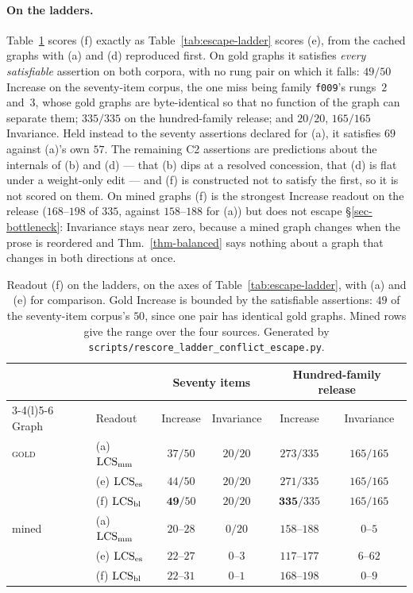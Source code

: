 \paragraph{On the ladders.} Table~\ref{tab:balanced-ladder} scores (f) exactly as
Table~\ref{tab:escape-ladder} scores (e), from the cached graphs with (a) and (d) reproduced first.
On gold graphs it satisfies \emph{every satisfiable} assertion on both corpora, with no rung pair on
which it falls: $49/50$ Increase on the seventy-item corpus, the one miss being family \texttt{f009}'s
rungs~$2$ and~$3$, whose gold graphs are byte-identical so that no function of the graph can separate
them; $335/335$ on the hundred-family release; and $20/20$, $165/165$ Invariance. Held instead to the
seventy assertions declared for (a), it satisfies $69$ against (a)'s own $57$. The remaining C2
assertions are predictions about the internals of (b) and (d) --- that (b) dips at a resolved
concession, that (d) is flat under a weight-only edit --- and (f) is constructed not to satisfy the
first, so it is not scored on them. On mined graphs (f) is the strongest Increase readout on the
release ($168$--$198$ of $335$, against $158$--$188$ for (a)) but does not escape
\S\ref{sec-bottleneck}: Invariance stays near zero, because a mined graph changes when the prose is
reordered and Thm.~\ref{thm-balanced} says nothing about a graph that changes in both directions at
once.

\begin{table}[tbp]
\centering\small
\caption{Readout (f) on the ladders, on the axes of Table~\ref{tab:escape-ladder}, with (a) and
  (e) for comparison. Gold Increase is bounded by the satisfiable assertions: $49$ of the
  seventy-item corpus's $50$, since one pair has identical gold graphs. Mined rows give the range over
  the four sources. Generated by \texttt{scripts/rescore\_ladder\_conflict\_escape.py}.}
\label{tab:balanced-ladder}
\setlength{\tabcolsep}{4pt}
\begin{tabular}{@{}llcccc@{}}
\toprule
& & \multicolumn{2}{c}{Seventy items} & \multicolumn{2}{c}{Hundred-family release} \\
\cmidrule(lr){3-4}\cmidrule(l){5-6}
Graph & Readout & Increase & Invariance & Increase & Invariance \\
\midrule
\textsc{gold} & (a) $\mathrm{LCS}_{\mathrm{mm}}$     & $37/50$ & $20/20$ & $273/335$ & $165/165$ \\
              & (e) $\mathrm{LCS}_{\mathrm{es}}$    & $44/50$ & $20/20$ & $271/335$ & $165/165$ \\
              & (f) $\mathrm{LCS}_{\mathrm{bl}}$    & $\mathbf{49}/50$ & $20/20$ & $\mathbf{335}/335$ & $165/165$ \\
\midrule
mined & (a) $\mathrm{LCS}_{\mathrm{mm}}$     & $20$--$28$ & $0/20$ & $158$--$188$ & $0$--$5$ \\
      & (e) $\mathrm{LCS}_{\mathrm{es}}$    & $22$--$27$ & $0$--$3$ & $117$--$177$ & $6$--$62$ \\
      & (f) $\mathrm{LCS}_{\mathrm{bl}}$    & $22$--$31$ & $0$--$1$ & $168$--$198$ & $0$--$9$ \\
\bottomrule
\end{tabular}
\end{table}

